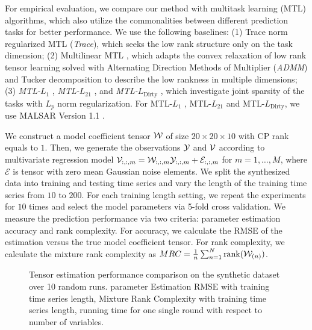 For empirical evaluation, we compare our method with  multitask learning (MTL) algorithms, which also utilize the commonalities between different prediction tasks for better performance. We use the following baselines: (1) Trace norm regularized MTL (\textit{Trace}), which seeks the low rank structure only on the task dimension; (2) Multilinear MTL \cite{romera2013multilinear}, which adapts the convex relaxation of low rank tensor learning solved with Alternating Direction Methods of Multiplier  (\textit{ADMM}) \cite{gabay1976dual} and Tucker decomposition to describe the low rankness in multiple dimensions; (3) \textit{MTL-$L_1$} , \textit{MTL-$L_{21}$} \cite{nie2010efficient}, and\textit{ MTL-$L_{\mathrm{Dirty}}$}  \cite{jalali2010dirty}, which investigate joint sparsity of the tasks with $L_p$ norm regularization. For MTL-$L_1$ , MTL-$L_{21}$ \cite{nie2010efficient} and MTL-$L_{\mathrm{Dirty}}$, we use MALSAR Version 1.1 \cite{zhou2012mutal}. 


We construct a model coefficient tensor ${\mathcal W}$ of size $20 \times 20 \times 10 $ with CP rank equals to $1$.  Then, we generate the observations ${\mathcal Y}$ and ${\mathcal V}$ according to multivariate regression model ${\mathcal V}_{:,:,m} = {\mathcal W}_{:,:,m}{\mathcal Y}_{:, :, m} + \mathcal{E}_{:,:,m}$ for $m = 1, \ldots, M$, where $\mathcal{E}$ is tensor with zero mean Gaussian noise elements. We split the synthesized data into training and testing time series and vary the length of the training time series from $10$ to $200$. For each training length setting, we repeat the experiments for $10$ times and select the model parameters via 5-fold cross validation. We measure the prediction performance  via two criteria: parameter estimation accuracy and rank complexity. For accuracy, we calculate the RMSE of the estimation versus the true model coefficient tensor. For rank complexity, we calculate the mixture rank complexity \cite{tomioka2010estimation} as $MRC = \frac{1}{n}\sum_{n=1}^{N}\mathrm{rank}({\mathcal W}_{(n)})$. 

\begin{figure*}[t]
\centering 
{}
\label{fig:synthetic}
\caption{Tensor estimation performance comparison on the synthetic dataset over 10 random runs.   parameter Estimation RMSE with training time series length,   Mixture Rank Complexity with training  time series length,   running time for one single round with respect to number of variables.}
\vskip -0.2in
\end{figure*} 



